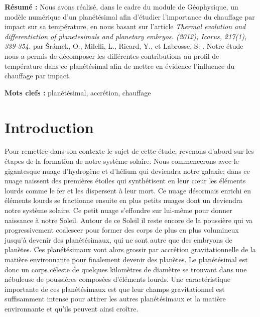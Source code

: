 \documentclass[10pt,a4paper]{article}
\numberwithin{equation}{section}
\begin{document}
\begin{titlepage}
\vspace{0.5cm}

\textbf{Résumé :} 
Nous avons réalisé, dans le cadre du module de Géophysique, un modèle numérique d'un planétésimal afin d'étudier l'importance du chauffage par impact sur sa température, en nous basant sur l'article \textit{Thermal evolution and differentiation of planetesimals and planetary embryos. (2012), Icarus, 217(1), 339-354.} par Šrámek, O., Milelli, L., Ricard, Y., et Labrosse, S. .  Notre étude nous a permis de décomposer les différentes contributions au profil de température dans ce planétésimal afin de mettre en évidence l'influence du chauffage par impact.
\vspace{0.3cm}

\textbf{Mots clefs :} planétésimal, accrétion, chauffage
\vspace{0.3cm}



\tableofcontents

\end{titlepage}


\newpage
\renewcommand\thepage{\arabic{page}}

\setcounter{page}{1}

\section*{Introduction}

Pour remettre dans son contexte le sujet de cette étude, revenons d'abord sur les étapes de la formation de notre système solaire. Nous commencerons avec le gigantesque nuage d'hydrogène et d'hélium qui deviendra notre galaxie; dans ce nuage naissent des premières étoiles qui synthétisent en leur cœur les éléments lourds comme le fer et les dispersent à leur mort. Ce nuage désormais enrichi en éléments lourds se fractionne ensuite en plus petits nuages dont un deviendra notre système solaire. Ce petit nuage s'effondre sur lui-même pour donner naissance à notre Soleil. Autour de ce Soleil il reste encore de la poussière qui va progressivement coalescer pour former des corps de plus en plus volumineux jusqu'à devenir des planétésimaux, qui ne sont autre que des embryons de planètes. Ces planétésimaux vont alors grossir par accrétion gravitationnelle de la matière environnante pour finalement devenir des planètes. Le planétésimal est donc un corps céleste de quelques kilomètres de diamètre se trouvant dans une nébuleuse de poussières composées d'éléments lourds. Une caractéristique importante de ces planétésimaux est que leur champs gravitationnel est suffisamment intense pour attirer les autres planétésimaux et la matière environnante et qu'ils peuvent ainsi croître.
\end{document}
